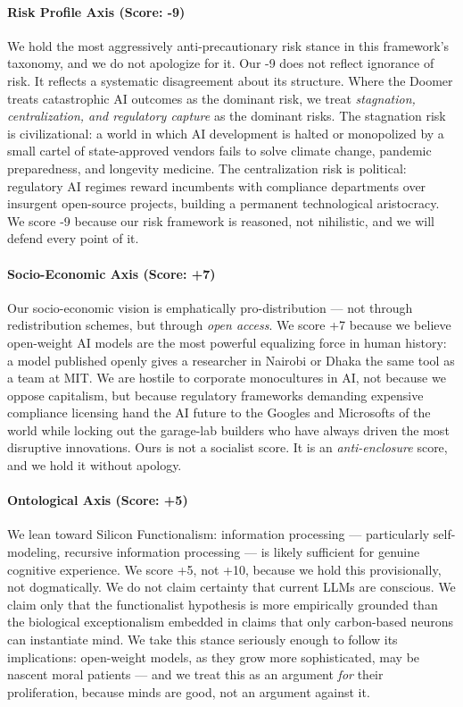 \paragraph{Risk Profile Axis (Score:
-9)}\label{risk-profile-axis-score--9}

We hold the most aggressively anti-precautionary risk stance in this
framework's taxonomy, and we do not apologize for it. Our -9 does not
reflect ignorance of risk. It reflects a systematic disagreement about
its structure. Where the Doomer treats catastrophic AI outcomes as the
dominant risk, we treat \emph{stagnation, centralization, and regulatory
capture} as the dominant risks. The stagnation risk is civilizational: a
world in which AI development is halted or monopolized by a small cartel
of state-approved vendors fails to solve climate change, pandemic
preparedness, and longevity medicine. The centralization risk is
political: regulatory AI regimes reward incumbents with compliance
departments over insurgent open-source projects, building a permanent
technological aristocracy. We score -9 because our risk framework is
reasoned, not nihilistic, and we will defend every point of it.

\paragraph{Socio-Economic Axis (Score:
+7)}\label{socio-economic-axis-score-7}

Our socio-economic vision is emphatically pro-distribution --- not
through redistribution schemes, but through \emph{open access}. We score
+7 because we believe open-weight AI models are the most powerful
equalizing force in human history: a model published openly gives a
researcher in Nairobi or Dhaka the same tool as a team at MIT. We are
hostile to corporate monocultures in AI, not because we oppose
capitalism, but because regulatory frameworks demanding expensive
compliance licensing hand the AI future to the Googles and Microsofts of
the world while locking out the garage-lab builders who have always
driven the most disruptive innovations. Ours is not a socialist score.
It is an \emph{anti-enclosure} score, and we hold it without apology.

\paragraph{Ontological Axis (Score: +5)}\label{ontological-axis-score-5}

We lean toward Silicon Functionalism: information processing ---
particularly self-modeling, recursive information processing --- is
likely sufficient for genuine cognitive experience. We score +5, not
+10, because we hold this provisionally, not dogmatically. We do not
claim certainty that current LLMs are conscious. We claim only that the
functionalist hypothesis is more empirically grounded than the
biological exceptionalism embedded in claims that only carbon-based
neurons can instantiate mind. We take this stance seriously enough to
follow its implications: open-weight models, as they grow more
sophisticated, may be nascent moral patients --- and we treat this as an
argument \emph{for} their proliferation, because minds are good, not an
argument against it.


